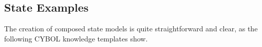 %
%
%
%
%
%
%

\subsection{State Examples}
\label{state_examples_heading}

The creation of composed state models is quite straightforward and clear, as
the following CYBOL knowledge templates show.






